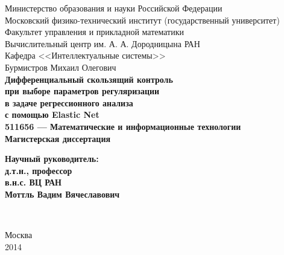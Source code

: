 {
	\renewcommand{\baselinestretch}{1}
	\thispagestyle{empty}
	\begin{center}
		\sc
			Министерство образования и науки Российской Федерации\\
			Московский физико-технический институт {\rm(государственный университет)}\\
			Факультет управления и прикладной математики\\
			Вычислительный центр им. А. А. Дородницына РАН\\
			Кафедра <<Интеллектуальные системы>>\\[40mm]
		\rm\large
			Бурмистров Михаил Олегович\\[5mm] 
		\bf\Large
			Дифференциальный скользящий контроль \\
			при выборе параметров регуляризации \\
			в задаче регрессионного анализа \\
			с помощью Elastic Net \\ [5mm]
		\rm\normalsize
			{511656 --- Математические и информационные технологии}\\[5mm]
		\sc
		Магистерская диссертация
		\vspace{40mm}
	\end{center}
	\hfill \parbox{80mm} { 
		\begin{flushleft}
			\bf{Научный руководитель:}\\
			\rm д.т.н., профессор \\
			в.н.с. ВЦ РАН \\
			Моттль Вадим Вячеславович
		\end{flushleft}
	}
	\\ \vspace{2cm}
	\begin{center}
		Москва\\
		2014
	\end{center}
}